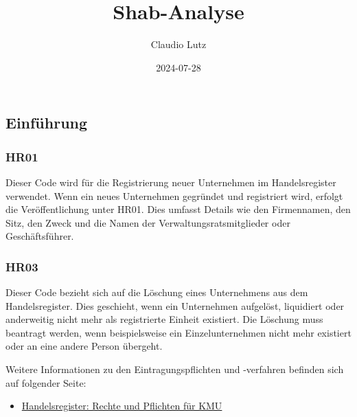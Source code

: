 \documentclass[
]{article}
\title{Shab-Analyse}
\author{Claudio Lutz}
\date{2024-07-28}
\providecommand{\tightlist}{%
  \setlength{\itemsep}{0pt}\setlength{\parskip}{0pt}}
\begin{document}
\maketitle

\subsection{Einführung}\label{einfuxfchrung}

\subsubsection{HR01}\label{hr01}

Dieser Code wird für die Registrierung neuer Unternehmen im
Handelsregister verwendet. Wenn ein neues Unternehmen gegründet und
registriert wird, erfolgt die Veröffentlichung unter HR01. Dies umfasst
Details wie den Firmennamen, den Sitz, den Zweck und die Namen der
Verwaltungsratsmitglieder oder Geschäftsführer.

\subsubsection{HR03}\label{hr03}

Dieser Code bezieht sich auf die Löschung eines Unternehmens aus dem
Handelsregister. Dies geschieht, wenn ein Unternehmen aufgelöst,
liquidiert oder anderweitig nicht mehr als registrierte Einheit
existiert. Die Löschung muss beantragt werden, wenn beispielsweise ein
Einzelunternehmen nicht mehr existiert oder an eine andere Person
übergeht.

Weitere Informationen zu den Eintragungspflichten und -verfahren
befinden sich auf folgender Seite:

\begin{itemize}
\tightlist
\item
  \href{https://www.kmu.admin.ch/kmu/de/home/praktisches-wissen/kmu-gruenden/firmengruendung/handelsregister.html}{Handelsregister:
  Rechte und Pflichten für KMU}
\end{itemize}
\end{document}

